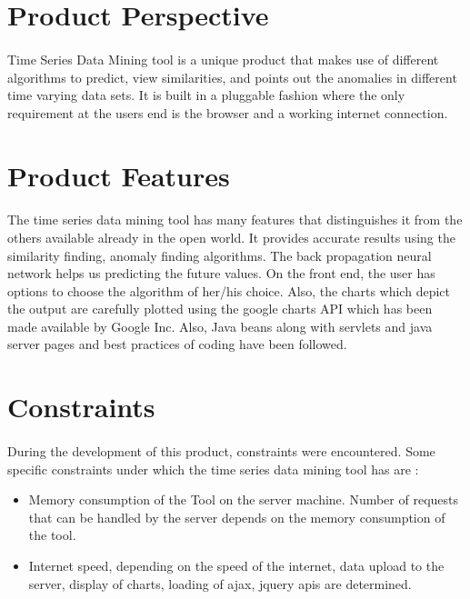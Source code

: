 \documentclass[12pt,a4paper]{report}
\begin{document}
\section{Product Perspective}

\paragraph{} Time Series Data Mining tool is a unique product that makes use of different algorithms to predict, view similarities, and points out the anomalies in different time varying data sets. It is built in a pluggable fashion where the only requirement at the users end is the browser and a working internet connection. 
\section{Product Features}
\paragraph{} 
The time series data mining tool has many features that distinguishes it from the others available already in the open world. It provides accurate results using the similarity finding, anomaly finding algorithms. The back propagation neural network helps us predicting the future values. On the front end, the user has options to choose the algorithm of her/his choice. Also, the charts which depict the output are carefully plotted using the google charts API which has been made available by Google Inc. Also, Java beans along with servlets and java server pages and best practices of coding have been followed. 
 
\section{Constraints}
\paragraph{}During the development of this product, constraints were encountered. Some specific constraints under which the time series data mining tool has are :

\begin{itemize} 
\item{} Memory consumption of the Tool on the server machine. Number of requests that can be handled by the server depends on the memory consumption of the tool.
\item{} Internet speed, depending on the speed of the internet, data upload to the server, display of charts, loading of ajax, jquery apis are determined.
\end{itemize}
\end{document}
